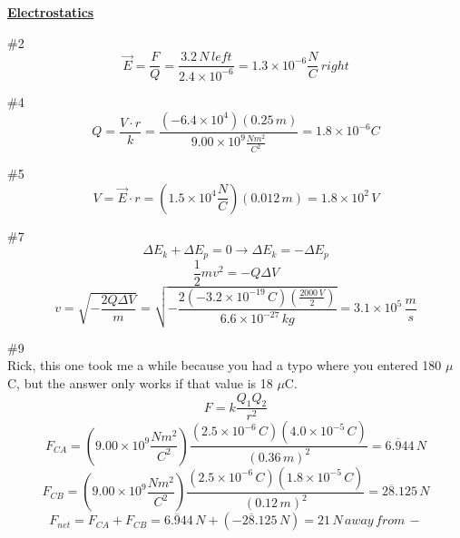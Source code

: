 \documentclass[12pt]{article}
\begin{document}
\begin{center}
	\LARGE{\textbf{\underline{Electrostatics}}}
\end{center}

\#2
\begin{equation}
\overrightarrow{E}=\frac{F}{Q}=\frac{3.2\, N\, left}{2.4\times10^{-6}}=1.3\times10^{-6}\frac{N}{C}\, right
\end{equation}

\#4
\begin{equation}
Q=\frac{V\cdot r}{k}=\frac{(-6.4\times 10^4)(0.25\,m)}{9.00\times 10^9\frac{Nm^2}{C^2}}=1.8\times 10^{-6}C
\end{equation}

\#5
\begin{equation}
V=\overrightarrow{E}\cdot r=(1.5\times 10^4\frac{N}{C})(0.012\,m)=1.8\times10^2\,V
\end{equation}

\#7
\begin{equation}
\Delta E_k + \Delta E_p = 0 \rightarrow \Delta E_k = -\Delta E_p
\end{equation}
\begin{equation}
\frac{1}{2}mv^2=-Q\Delta V
\end{equation}
\begin{equation}
v=\sqrt{-\frac{2Q\Delta V}{m}}=\sqrt{-\frac{2(-3.2\times 10^{-19}\,C)(\frac{2000\,V}{2})}{6.6\times 10^{-27}\,kg}}=3.1\times 10^5\, \frac{m}{s}
\end{equation}

\#9\\
Rick, this one took me a while because you had a typo where you entered 180 $\mu$C, but the answer only works if that value is 18 $\mu$C.
\begin{equation}
F=k\frac{Q_1Q_2}{r^2}
\end{equation}
\begin{equation}
F_{CA}=(9.00\times10^9\frac{Nm^2}{C^2})\frac{(2.5\times10^{-6}\,C)(4.0\times10^{-5}\,C)}{(0.36\,m)^2}=6.\overline{9}44\,N
\end{equation}
\begin{equation}
F_{CB}=(9.00\times10^9\frac{Nm^2}{C^2})\frac{(2.5\times10^{-6}\,C)(1.8\times10^{-5}\,C)}{(0.12\,m)^2}=2\overline{8}.125\,N
\end{equation}
\begin{equation}
F_{net}=F_{CA}+F_{CB}=6.\overline{9}44\,N+(-2\overline{8}.125\,N)=21\,N\,away\,from\,-
\end{equation}
\end{document}
